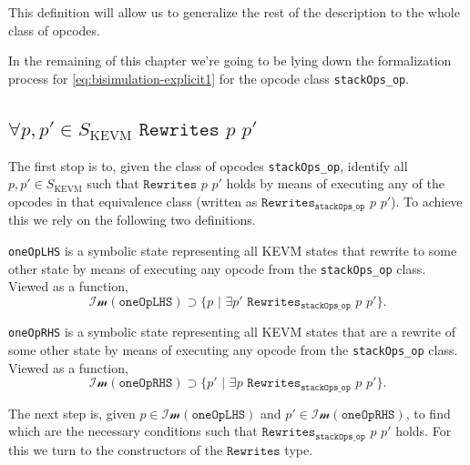 This definition will allow us to generalize the rest of the description to the
whole class of opcodes.

In the remaining of this chapter we're going to be lying down the formalization
process for \ref{eq:bisimulation-explicit1} for the opcode class
\texttt{stackOps_op}.

\subsection{$\forall p, p'\in S_{\text{KEVM}}\,\, \texttt{Rewrites}\,\, p \,\, p'$}

The first stop is to, given the class of opcodes \texttt{stackOps_op},
identify all $p, p'\in S_{\text{KEVM}}$ such that $\texttt{Rewrites}\,\, p \,\,
p'$ holds by means of executing any of the opcodes in that equivalence class
(written as $\texttt{Rewrites}_{\texttt{stackOps_op}}\,\, p \,\, p'$).
To achieve this we rely on the following two definitions.

\begin{definition}[oneOpLHS]\label{def:oneOpLHS}
\leanok{}

\texttt{oneOpLHS} is a symbolic state representing all KEVM states that
rewrite to some other state by means of executing any opcode from the
\texttt{stackOps_op} class. Viewed as a
function, $$\mathcal{Im}(\texttt{oneOpLHS}) \supset \{p\,\, |\,\, \exists
p'\,\,\texttt{Rewrites}_{\texttt{stackOps_op}}\,\, p \,\, p'\}.$$

\end{definition}

\begin{definition}[oneOpRHS]\label{def:oneOpRHS}
\leanok{}

\texttt{oneOpRHS} is a symbolic state representing all KEVM states that are a
rewrite of some other state by means of executing any opcode from the
\texttt{stackOps_op} class. Viewed as a
function, $$\mathcal{Im}(\texttt{oneOpRHS}) \supset \{p'\,\, |\,\, \exists
p\,\,\texttt{Rewrites}_{\texttt{stackOps_op}}\,\, p \,\, p'\}.$$

\end{definition}

The next step is, given $p\in\mathcal{Im}(\texttt{oneOpLHS})$ and
$p'\in\mathcal{Im}(\texttt{oneOpRHS})$, to find which are the necessary
conditions such that $\texttt{Rewrites}_{\texttt{stackOps_op}}\,\, p \,\, p'$
holds. For this we turn to the constructors of the $\texttt{Rewrites}$ type.

